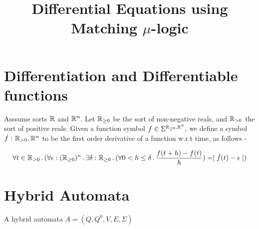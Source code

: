 \documentclass[]{article}
\title{Differential Equations using Matching $\mu$-logic}
\newcommand{\SortR}{S_{\R \rightarrow \R}}
\newcommand{\differential}{\textit{differential}}
\begin{document}
\maketitle

\section{Differentiation and Differentiable functions}

Asssume sorts $\mathbb{R}$ and $\mathbb{R}^{n}$. Let $\mathbb{R}_{\geq 0}$ be the sort of non-negative
reals, and $\mathbb{R}_{> 0}$ the sort of positive reals.
Given a function symbol $f \in \Sigma^{\mathbb{R}_{\geq 0}, \mathbb{R}^{n}}$,
we define a symbol $\dot{f} \ \mathord{:} \ \mathbb{R}_{> 0}, \mathbb{R}^{n}$ to be the first
order derivative of a function w.r.t time, as follows -


$$ \forall t \in \mathbb{R}_{> 0} \,\mathord{.}\, (\forall \epsilon : (\mathbb{R}_{\geq 0})^n \,\mathord{.}\, \exists \delta :
\mathbb{R}_{\geq 0} \,\mathord{.}\, (\forall 0 < h \leq \delta \,\mathord{.}\, \frac{f(t + h) -f(t)}{h}) = \mid
\dot{f}(t) - \epsilon \mid) $$



%
%
%
%
%
%
\section{Hybrid Automata}

A hybrid automata $A = (Q,Q^0,V,E,\Sigma)$
\end{document}
